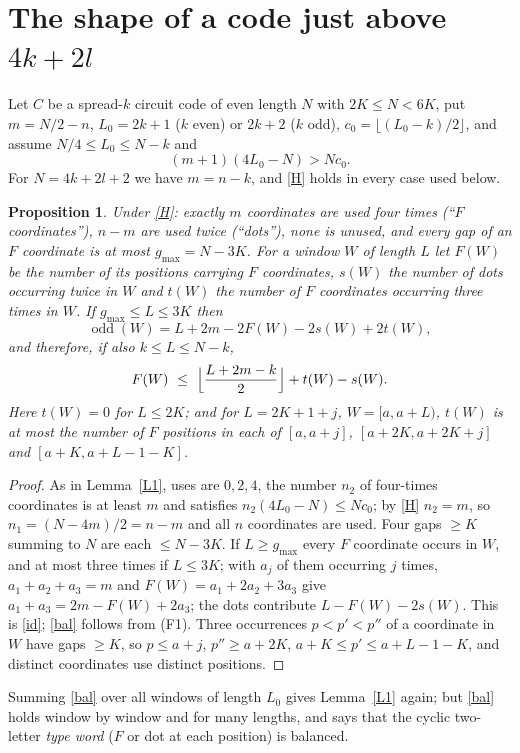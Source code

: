 \documentclass[11pt]{article}
\newtheorem{proposition}{Proposition}
\theoremstyle{remark}
\newcommand{\odd}{\operatorname{odd}}
\begin{document}
\section{The shape of a code just above $4k+2l$}\label{sec:shape}
Let $C$ be a spread-$k$ circuit code of even length $N$ with $2K\le N<6K$, put $m=N/2-n$, $L_0=2k+1$ ($k$ even) or $2k+2$ ($k$ odd),
$c_0=\lfloor (L_0-k)/2\rfloor$, and assume $N/4\le L_0\le N-k$ and
\begin{equation}\label{H} (m+1)(4L_0-N)>Nc_0 . \end{equation}
For $N=4k+2l+2$ we have $m=n-k$, and \eqref{H} holds in every case used below.
\begin{proposition}\label{shape}
Under \eqref{H}: exactly $m$ coordinates are used four times (``$F$ coordinates''), $n-m$ are used twice (``dots''), none is unused,
and every gap of an $F$ coordinate is at most $g_{\max}=N-3K$. For a window $W$ of length $L$ let $F(W)$ be the number of its
positions carrying $F$ coordinates, $s(W)$ the number of dots occurring twice in $W$ and $t(W)$ the number of $F$ coordinates
occurring three times in $W$. If $g_{\max}\le L\le 3K$ then
\begin{equation}\label{id} \odd(W)=L+2m-2F(W)-2s(W)+2t(W), \end{equation}
and therefore, if also $k\le L\le N-k$,
\begin{equation}\label{bal} F(W)\ \le\ \Bigl\lfloor\frac{L+2m-k}{2}\Bigr\rfloor+t(W)-s(W). \end{equation}
Here $t(W)=0$ for $L\le 2K$; and for $L=2K+1+j$, $W=[a,a+L)$, $t(W)$ is at most the number of $F$ positions in each of
$[a,a+j]$, $[a+2K,a+2K+j]$ and $[a+K,a+L-1-K]$.
\end{proposition}
\begin{proof}
As in Lemma~\ref{L1}, uses are $0,2,4$, the number $n_2$ of four-times coordinates is at least $m$ and satisfies
$n_2(4L_0-N)\le Nc_0$; by \eqref{H} $n_2=m$, so $n_1=(N-4m)/2=n-m$ and all $n$ coordinates are used. Four gaps $\ge K$ summing to $N$
are each $\le N-3K$. If $L\ge g_{\max}$ every $F$ coordinate occurs in $W$, and at most three times if $L\le 3K$; with $a_j$ of them
occurring $j$ times, $a_1+a_2+a_3=m$ and $F(W)=a_1+2a_2+3a_3$ give $a_1+a_3=2m-F(W)+2a_3$; the dots contribute $L-F(W)-2s(W)$.
This is \eqref{id}; \eqref{bal} follows from (F1). Three occurrences $p<p'<p''$ of a coordinate in $W$ have gaps $\ge K$, so
$p\le a+j$, $p''\ge a+2K$, $a+K\le p'\le a+L-1-K$, and distinct coordinates use distinct positions.
\end{proof}
Summing \eqref{bal} over all windows of length $L_0$ gives Lemma~\ref{L1} again; but \eqref{bal} holds window by window and for many
lengths, and says that the cyclic two-letter \emph{type word} ($F$ or dot at each position) is balanced.
\end{document}
